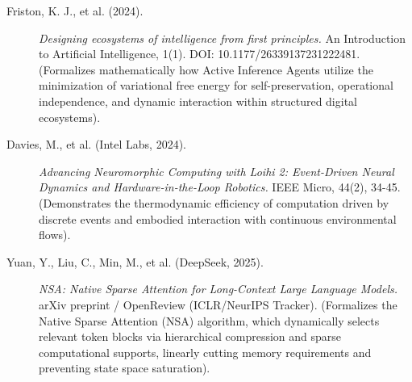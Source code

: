 \documentclass[11pt,a4paper,oneside]{article} %
\begin{document}
\begin{description}
\item[Friston, K. J., et al. (2024).] \emph{Designing ecosystems of intelligence from first principles.} An Introduction to Artificial Intelligence, 1(1). DOI: 10.1177/26339137231222481. (Formalizes mathematically how Active Inference Agents utilize the minimization of variational free energy for self-preservation, operational independence, and dynamic interaction within structured digital ecosystems).
\end{description}

\hypertarget{a1.2-neuromorphic-computing-and-event-driven-computation}{%
\label{a1.2-neuromorphic-computing-and-event-driven-computation}}

\begin{description}
\item[Davies, M., et al. (Intel Labs, 2024).] \emph{Advancing Neuromorphic Computing with Loihi 2: Event-Driven Neural Dynamics and Hardware-in-the-Loop Robotics.} IEEE Micro, 44(2), 34-45. (Demonstrates the thermodynamic efficiency of computation driven by discrete events and embodied interaction with continuous environmental flows).
\end{description}

\hypertarget{a1.3-sparse-dynamic-attention-and-intrinsic-reward}{%
\label{a1.3-sparse-dynamic-attention-and-intrinsic-reward}}

\begin{description}
\item[Yuan, Y., Liu, C., Min, M., et al. (DeepSeek, 2025).] \emph{NSA: Native Sparse Attention for Long-Context Large Language Models.} arXiv preprint / OpenReview (ICLR/NeurIPS Tracker). (Formalizes the Native Sparse Attention (NSA) algorithm, which dynamically selects relevant token blocks via hierarchical compression and sparse computational supports, linearly cutting memory requirements and preventing state space saturation).
\end{description}

\hypertarget{a1.4-dynamic-compute-allocation-and-test-time-compute}{%
\label{a1.4-dynamic-compute-allocation-and-test-time-compute}}
\end{document}
